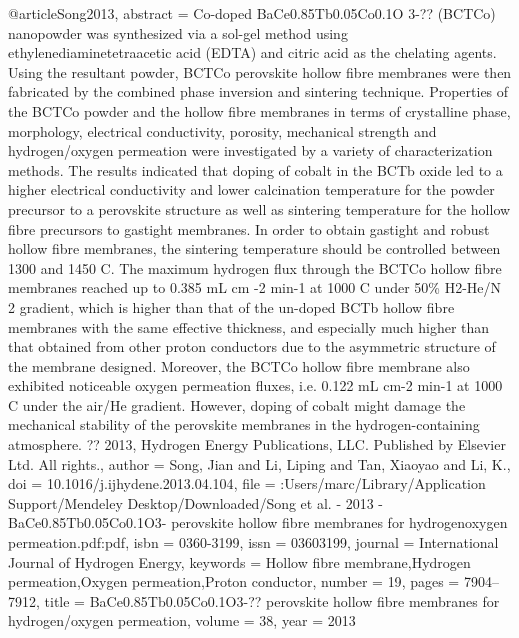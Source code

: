 @article{Song2013,
abstract = {Co-doped BaCe0.85Tb0.05Co0.1O 3-?? (BCTCo) nanopowder was synthesized via a sol-gel method using ethylenediaminetetraacetic acid (EDTA) and citric acid as the chelating agents. Using the resultant powder, BCTCo perovskite hollow fibre membranes were then fabricated by the combined phase inversion and sintering technique. Properties of the BCTCo powder and the hollow fibre membranes in terms of crystalline phase, morphology, electrical conductivity, porosity, mechanical strength and hydrogen/oxygen permeation were investigated by a variety of characterization methods. The results indicated that doping of cobalt in the BCTb oxide led to a higher electrical conductivity and lower calcination temperature for the powder precursor to a perovskite structure as well as sintering temperature for the hollow fibre precursors to gastight membranes. In order to obtain gastight and robust hollow fibre membranes, the sintering temperature should be controlled between 1300 and 1450 C. The maximum hydrogen flux through the BCTCo hollow fibre membranes reached up to 0.385 mL cm -2 min-1 at 1000 C under 50{\%} H2-He/N 2 gradient, which is higher than that of the un-doped BCTb hollow fibre membranes with the same effective thickness, and especially much higher than that obtained from other proton conductors due to the asymmetric structure of the membrane designed. Moreover, the BCTCo hollow fibre membrane also exhibited noticeable oxygen permeation fluxes, i.e. 0.122 mL cm-2 min-1 at 1000 C under the air/He gradient. However, doping of cobalt might damage the mechanical stability of the perovskite membranes in the hydrogen-containing atmosphere. ?? 2013, Hydrogen Energy Publications, LLC. Published by Elsevier Ltd. All rights.},
author = {Song, Jian and Li, Liping and Tan, Xiaoyao and Li, K.},
doi = {10.1016/j.ijhydene.2013.04.104},
file = {:Users/marc/Library/Application Support/Mendeley Desktop/Downloaded/Song et al. - 2013 - BaCe0.85Tb0.05Co0.1O3- perovskite hollow fibre membranes for hydrogenoxygen permeation.pdf:pdf},
isbn = {0360-3199},
issn = {03603199},
journal = {International Journal of Hydrogen Energy},
keywords = {Hollow fibre membrane,Hydrogen permeation,Oxygen permeation,Proton conductor},
number = {19},
pages = {7904--7912},
title = {{BaCe0.85Tb0.05Co0.1O3-?? perovskite hollow fibre membranes for hydrogen/oxygen permeation}},
volume = {38},
year = {2013}
}
